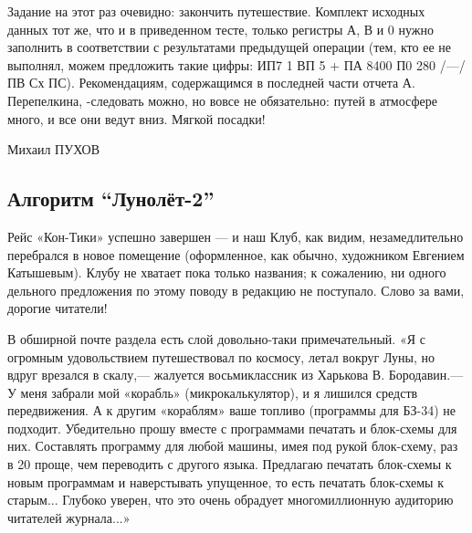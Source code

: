 \documentclass[11pt,a4paper,oneside]{article}
\begin{document}
Задание на этот раз очевидно: закончить путешествие. Комплект исходных данных тот же, что и в приведенном тесте, только регистры А, В и 0 нужно заполнить в соответствии с результатами предыдущей операции (тем, кто ее не выполнял, можем предложить такие цифры: ИП7 1 ВП 5 + ПА 8400 П0 280 /—/ ПВ Сх ПС). Рекомендациям, содержащимся в последней части отчета А. Перепелкина, -следовать можно, но вовсе не обязательно: путей в атмосфере много, и все они ведут вниз. Мягкой посадки!

Михаил ПУХОВ

\subsection{Алгоритм ``Лунолёт-2''}
Рейс «Кон-Тики» успешно завершен — и наш Клуб, как видим, незамедлительно перебрался в новое помещение (оформленное, как обычно, художником Евгением Катышевым). Клубу не хватает пока только названия; к сожалению, ни одного дельного предложения по этому поводу в редакцию не поступало. Слово за вами, дорогие читатели!

В обширной почте раздела есть слой довольно-таки примечательный. «Я с огромным удовольствием путешествовал по космосу, летал вокруг Луны, но вдруг врезался в скалу,— жалуется восьмиклассник из Харькова В. Бородавин.— У меня забрали мой «корабль» (микрокалькулятор), и я лишился средств передвижения. А к другим «кораблям» ваше топливо (программы для БЗ-34) не подходит. Убедительно прошу вместе с программами печатать и блок-схемы для них. Составлять программу для любой машины, имея под рукой блок-схему, раз в 20 проще, чем переводить с другого языка. Предлагаю печатать блок-схемы к новым программам и наверстывать упущенное, то есть печатать блок-схемы к старым... Глубоко уверен, что это очень обрадует многомиллионную аудиторию читателей журнала...»
\end{document}

